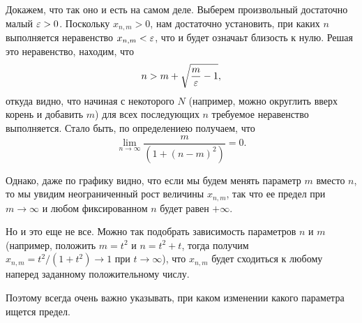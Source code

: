 \begin{enumerate}
Докажем, что так оно и есть на самом деле. Выберем произвольный достаточно малый $\varepsilon>0$. Поскольку $x_{n,m}>0$, нам достаточно установить, при каких $n$ выполняется неравенство $x_{n,m}<\varepsilon$, что и будет означаьт близость к нулю. Решая это неравенство, находим, что
$$
n>m+\sqrt{\frac{m}{\varepsilon}-1},
$$
откуда видно, что начиная с некоторого $N$ (например, можно округлить вверх корень и добавить $m$) для всех последующих $n$ требуемое неравенство выполняется. Стало быть, по определениею получаем, что
$$
\lim_{n\to\infty}\frac{m}{(1+(n-m)^2)}=0.
$$

Однако, даже по графику видно, что если мы будем менять параметр $m$ вместо $n$, то мы увидим неограниченный рост величины $x_{n,m}$, так что ее предел при $m\to\infty$ и любом фиксированном $n$ будет равен $+\infty$.

Но и это еще не все. Можно так подобрать зависимость параметров $n$ и $m$ (например, положить $m=t^2$ и $n=t^2+t$, тогда получим $x_{n,m}=t^2/(1+t^2)\to 1$ при $t\to\infty$), что $x_{n,m}$ будет сходиться к любому наперед заданному положительному числу.

Поэтому всегда очень важно указывать, при каком изменении какого параметра ищется предел.


\end{enumerate}
